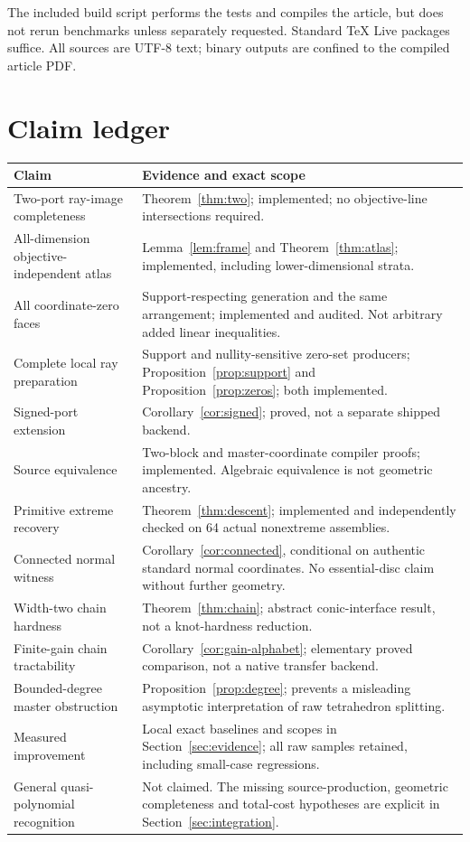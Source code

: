 The included build script performs the tests and compiles the article, but does not rerun benchmarks unless separately requested. Standard TeX Live packages suffice. All sources are UTF-8 text; binary outputs are confined to the compiled article PDF.

\section{Claim ledger}
\begin{longtable}{@{}p{}p{}@{}}
\toprule
Claim & Evidence and exact scope\\\midrule\endhead
Two-port ray-image completeness & Theorem~\ref{thm:two}; implemented; no objective-line intersections required.\\
All-dimension objective-independent atlas & Lemma~\ref{lem:frame} and Theorem~\ref{thm:atlas}; implemented, including lower-dimensional strata.\\
All coordinate-zero faces & Support-respecting generation and the same arrangement; implemented and audited. Not arbitrary added linear inequalities.\\
Complete local ray preparation & Support and nullity-sensitive zero-set producers; Proposition~\ref{prop:support} and Proposition~\ref{prop:zeros}; both implemented.\\
Signed-port extension & Corollary~\ref{cor:signed}; proved, not a separate shipped backend.\\
Source equivalence & Two-block and master-coordinate compiler proofs; implemented. Algebraic equivalence is not geometric ancestry.\\
Primitive extreme recovery & Theorem~\ref{thm:descent}; implemented and independently checked on 64 actual nonextreme assemblies.\\
Connected normal witness & Corollary~\ref{cor:connected}, conditional on authentic standard normal coordinates. No essential-disc claim without further geometry.\\
Width-two chain hardness & Theorem~\ref{thm:chain}; abstract conic-interface result, not a knot-hardness reduction.\\
Finite-gain chain tractability & Corollary~\ref{cor:gain-alphabet}; elementary proved comparison, not a native transfer backend.\\
Bounded-degree master obstruction & Proposition~\ref{prop:degree}; prevents a misleading asymptotic interpretation of raw tetrahedron splitting.\\
Measured improvement & Local exact baselines and scopes in Section~\ref{sec:evidence}; all raw samples retained, including small-case regressions.\\
General quasi-polynomial recognition & Not claimed. The missing source-production, geometric completeness and total-cost hypotheses are explicit in Section~\ref{sec:integration}.\\
\bottomrule
\end{longtable}

